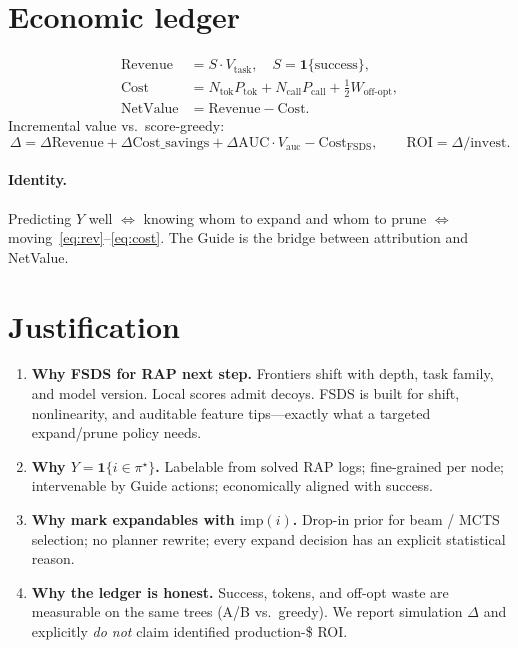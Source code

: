 \documentclass[11pt]{article}
\newcommand{\imp}{\mathrm{imp}}
\newcommand{\NV}{\mathrm{NetValue}}
\newcommand{\ROI}{\mathrm{ROI}}
\newcommand{\ind}{\mathbf{1}}
\begin{document}
\section{Economic ledger}
\label{sec:econ}

\begin{align}
  \mathrm{Revenue} &= S\cdot V_{\mathrm{task}},
  \quad S=\ind\{\text{success}\},
  \label{eq:rev}\\
  \mathrm{Cost}
  &= N_{\mathrm{tok}}P_{\mathrm{tok}}
   + N_{\mathrm{call}}P_{\mathrm{call}}
   + \tfrac12 W_{\mathrm{off\text{-}opt}},
  \label{eq:cost}\\
  \NV &= \mathrm{Revenue}-\mathrm{Cost}.
  \label{eq:nv}
\end{align}
Incremental value vs.\ score-greedy:
\begin{equation}
  \Delta
  =\Delta\mathrm{Revenue}
  +\Delta\mathrm{Cost\_savings}
  +\Delta\mathrm{AUC}\cdot V_{\mathrm{auc}}
  -\mathrm{Cost}_{\mathrm{FSDS}},
  \qquad
  \ROI=\Delta/\mathrm{invest}.
  \label{eq:roi}
\end{equation}

\paragraph{Identity.}
Predicting $Y$ well $\Leftrightarrow$ knowing whom to expand and whom to
prune $\Leftrightarrow$ moving~\eqref{eq:rev}--\eqref{eq:cost}.
The Guide is the bridge between attribution and NetValue.

\section{Justification}
\label{sec:justify}

\begin{enumerate}[leftmargin=1.3em]
  \item \textbf{Why FSDS for RAP next step.}
        Frontiers shift with depth, task family, and model version.
        Local scores admit decoys. FSDS is built for shift, nonlinearity,
        and auditable feature tips---exactly what a targeted expand/prune
        policy needs.
  \item \textbf{Why $Y=\ind\{i\in\pi^\star\}$.}
        Labelable from solved RAP logs; fine-grained per node;
        intervenable by Guide actions; economically aligned with success.
  \item \textbf{Why mark expandables with $\imp(i)$.}
        Drop-in prior for beam / MCTS selection; no planner rewrite;
        every expand decision has an explicit statistical reason.
  \item \textbf{Why the ledger is honest.}
        Success, tokens, and off-opt waste are measurable on the same
        trees (A/B vs.\ greedy). We report simulation $\Delta$ and
        explicitly \emph{do not} claim identified production-\$ ROI.
\end{enumerate}
\end{document}

